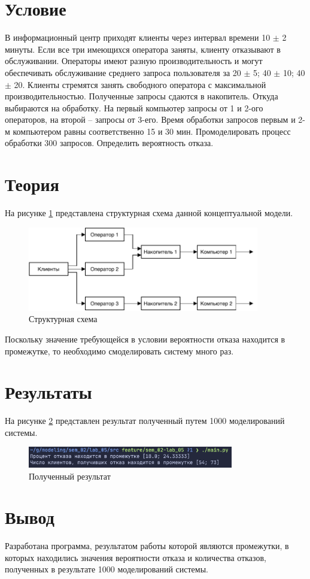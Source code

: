 \section{Условие}

В информационный центр приходят клиенты через интервал времени 10 $\pm$ 2 минуты. Если все три имеющихся оператора заняты, клиенту отказывают в обслуживании. Операторы имеют разную производительность и могут обеспечивать обслуживание среднего запроса пользователя за 20 $\pm$ 5; 40 $\pm$ 10; 40 $\pm$ 20. Клиенты стремятся занять свободного оператора с максимальной производительностью. Полученные запросы сдаются в накопитель. Откуда выбираются на обработку. На первый компьютер запросы от 1 и 2-ого операторов, на второй -- запросы от 3-его. Время обработки запросов первым и 2-м компьютером равны соответственно 15 и 30 мин. Промоделировать процесс обработки 300 запросов. Определить вероятность отказа.

\section{Теория}

На рисунке \ref{fig:model} представлена структурная схема  данной концептуальной модели.

\begin{figure}[H]
    \centering
    \includegraphics[width=0.9\textwidth]{img/content/model.pdf}
    \caption{Структурная схема}
    \label{fig:model}
\end{figure}

Поскольку значение требующейся в условии вероятности отказа находится в промежутке, то необходимо смоделировать систему много раз.

\section{Результаты}

На рисунке \ref{fig:result} представлен результат полученный путем 1000 моделирований системы.

\begin{figure}[H]
    \centering
    \includegraphics[width=0.8\textwidth]{img/content/result.png}
    \caption{Полученный результат}
    \label{fig:result}
\end{figure}

\section{Вывод}

Разработана программа, результатом работы которой являются промежутки, в которых находились значения вероятности отказа и количества отказов, полученных в результате 1000 моделирований системы.

